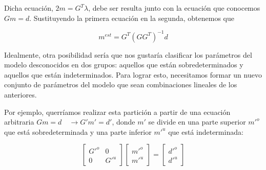 \documentclass[aspectratio=169]{beamer}
\begin{document}
\begin{frame}
 
{\color{black} Dicha ecuación, $2m=G^T\lambda$, debe ser resulta junto con la ecuación que conocemos $Gm = d$. Sustituyendo la primera ecuación en la segunda, obtenemos que 

\begin{equation}
 m^{est} = G^T (GG^T)^{-1} d
\end{equation}
}
 
\end{frame}

\begin{frame}

{\color{black}
Idealmente, otra posibilidad sería que nos gustaría clasificar los parámetros del modelo desconocidos en dos grupos: aquellos que están sobredeterminados y aquellos que están indeterminados. Para lograr esto, necesitamos formar un nuevo conjunto de parámetros del modelo que sean combinaciones lineales de los anteriores. 

Por ejemplo, querríamos realizar esta partición a partir de una ecuación arbitraria $Gm = d \quad \rightarrow  G'm'= d'$, donde $m'$ se divide en una parte superior $m'^o$ que está sobredeterminada y una parte inferior $m'^u$ que está indeterminada:

\begin{equation}
 \begin{bmatrix}
 G'^o & 0 \\
 0    & G'^u 
 \end{bmatrix} 
 \begin{bmatrix}
  m'^o \\
  m'^u 
 \end{bmatrix} = 
 \begin{bmatrix}
  d'^o \\
  d'^u
 \end{bmatrix}
\end{equation}
}

\end{frame}
\end{document}
